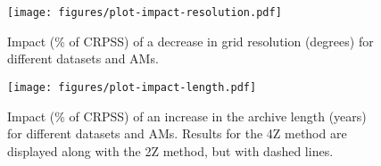 \documentclass{ametsoc}
\begin{document}
\begin{figure}[t]
	\noindent\texttt{[image: figures/plot-impact-resolution.pdf]}\\
	\caption{Impact (\% of CRPSS) of a decrease in grid resolution (degrees) for different datasets and AMs.}
	\label{fig:plot_impact_resolution}
\end{figure}

\begin{figure}[t]
	\noindent\texttt{[image: figures/plot-impact-length.pdf]}\\
	\caption{Impact (\% of CRPSS) of an increase in the archive length (years) for different datasets and AMs. Results for the 4Z method are displayed along with the 2Z method, but with dashed lines.}
	\label{fig:plot_impact_length}
\end{figure}
\end{document}
